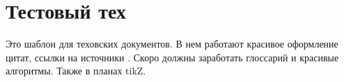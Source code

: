 \section{Тестовый тех}
\begin{grayquote}
	Это шаблон для теховских документов. В нем работают красивое оформление цитат, ссылки на источники \autocite{GAN}. Скоро должны заработать глоссарий и красивые алгоритмы. Также в планах tikZ.
\end{grayquote}
